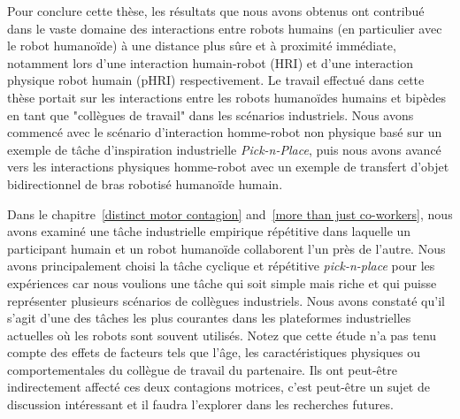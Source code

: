 Pour conclure cette thèse, les résultats que nous avons obtenus ont contribué dans le vaste domaine des interactions entre robots humains (en particulier avec le robot humanoïde) à une distance plus sûre et à proximité immédiate, notamment lors d'une interaction humain-robot (HRI) et d'une interaction physique robot humain (pHRI) respectivement. Le travail effectué dans cette thèse portait sur les interactions entre les robots humanoïdes humains et bipèdes en tant que "collègues de travail" dans les scénarios industriels. Nous avons commencé avec le scénario d'interaction homme-robot non physique basé sur un exemple de tâche d'inspiration industrielle \textit{Pick-n-Place}, puis nous avons avancé vers les interactions physiques homme-robot avec un exemple de transfert d'objet bidirectionnel de bras robotisé humanoïde humain.


 


Dans le chapitre~\ref{distinct motor contagion} and~\ref{more than just co-workers}, nous avons examiné une tâche industrielle empirique répétitive dans laquelle un participant humain et un robot humanoïde collaborent l'un près de l'autre. Nous avons principalement choisi la tâche cyclique et répétitive \textit{pick-n-place} pour les expériences car nous voulions une tâche qui soit simple mais riche et qui puisse représenter plusieurs scénarios de collègues industriels. Nous avons constaté qu'il s'agit d'une des tâches les plus courantes dans les plateformes industrielles actuelles où les robots sont souvent utilisés. Notez que cette étude n'a pas tenu compte des effets de facteurs tels que l'âge, les caractéristiques physiques ou comportementales du collègue de travail du partenaire. Ils ont peut-être indirectement affecté ces deux contagions motrices, c'est peut-être un sujet de discussion intéressant et il faudra l'explorer dans les recherches futures.




